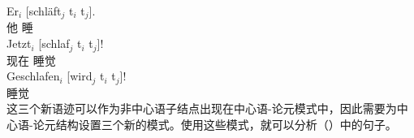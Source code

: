 \eal\settowidth{}
\ex 
\gll Er$_i$    [schläft$_j$ t$_i$ t$_j$].\\
	 他 \spacebr{}睡\\  
\ex 
\gll Jetzt$_i$ [schlaf$_j$ t$_i$ t$_j$]!\\
	 现在 \spacebr{}睡觉\\   
\ex 
\gll Geschlafen$_i$ [wird$_j$ t$_i$ t$_j$]! \\
	 睡觉 \spacebr{}\passiveprs{}\\
\zl
这三个新语迹可以作为非中心语子结点出现在中心语-论元模式中，因此需要为中心语-论元结构设置三个新的模式。使用这些模式，就可以分析（）中的句子。

